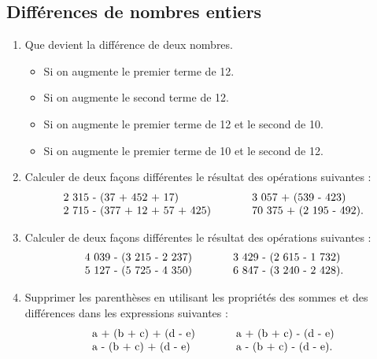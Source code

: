 \documentclass[12 pt]{extarticle}
\theoremstyle{plain}
\begin{document}
 \subsection{Différences de nombres entiers}
 \begin{enumerate}
 \item Que devient la différence de deux nombres.\begin{itemize}
 \item Si on augmente le premier terme de 12.
 \item Si on augmente le second terme de 12. 
 \item Si on augmente le premier terme de 12 et le second de 10. 
 \item Si on augmente le premier terme de 10 et le second de 12.
 \end{itemize}
 
 \item Calculer de deux façons différentes le résultat des opérations suivantes : 
 \[
 \begin{tabular}{l c l }
 2~315 - (37 + 452 + 17) & \ \ \ \ \ & 3~057 + (539 - 423) \\
 2~715 - (377 + 12 + 57 + 425) & \ \ \ \ \ & 70~375 + (2~195 - 492).
  \end{tabular}
 \]
 
  \item Calculer de deux façons différentes le résultat des opérations suivantes : 
 \[
 \begin{tabular}{l c l }
 4~039 - (3~215 - 2~237) & \ \ \ \ \ & 3~429 - (2~615 - 1~732) \\
 5~127 - (5~725 - 4~350) & \ \ \ \ \ & 6~847 - (3~240 - 2~428).
  \end{tabular}
 \]
 
 \item Supprimer les parenthèses en utilisant les propriétés des sommes et
 des différences dans les expressions suivantes : 
  \[
 \begin{tabular}{l c l }
 a + (b + c) + (d - e) & \ \ \ \ \ & a + (b + c) - (d - e) \\
 a - (b + c) + (d - e) & \ \ \ \ \ & a - (b + c) - (d - e).
  \end{tabular}
 \]
 

\end{enumerate}
\end{document}
